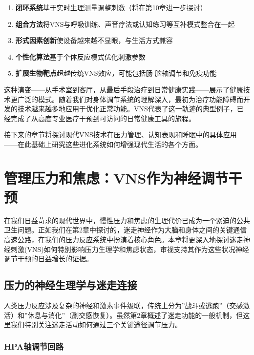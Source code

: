 \documentclass[
  Letterpaper,
]{scrbook}
\begin{document}
\begin{enumerate}
\def\labelenumi{\arabic{enumi}.}
\item
  \textbf{闭环系统}基于实时生理测量调整刺激（将在第10章进一步探讨）
\item
  \textbf{组合方法}将VNS与呼吸训练、声音疗法或认知练习等互补模式整合在一起
\item
  \textbf{形式因素创新}使设备越来越不显眼，与生活方式兼容
\item
  \textbf{个性化算法}基于个体反应模式优化刺激参数
\item
  \textbf{扩展生物靶点}超越传统VNS效应，可能包括肠-脑轴调节和免疫功能
\end{enumerate}

这种演变------从手术室到客厅，从最后手段治疗到日常健康实践------展示了健康技术更广泛的模式。随着我们对身体调节系统的理解深入，最初为治疗功能障碍而开发的技术越来越多地应用于优化正常功能。VNS代表了这一轨迹的典型例子，已经完成了从高度专业医疗干预到可访问的日常健康工具的旅程。

接下来的章节将探讨现代VNS技术在压力管理、认知表现和睡眠中的具体应用------在此基础上研究这些进化系统如何增强现代生活的各个方面。


\chapter{管理压力和焦虑：VNS作为神经调节干预}\label{ux7ba1ux7406ux538bux529bux548cux7126ux8651vnsux4f5cux4e3aux795eux7ecfux8c03ux8282ux5e72ux9884}

在我们日益苛求的现代世界中，慢性压力和焦虑的生理代价已成为一个紧迫的公共卫生问题。正如我们在第2章中探讨的，迷走神经作为大脑和身体之间的关键通信高速公路，在我们的压力反应系统中扮演着核心角色。本章将更深入地探讨迷走神经刺激(VNS)如何特别影响压力生理学和焦虑状态，审视支持其作为这些状况神经调节干预的日益增长的证据。

\section{压力的神经生理学与迷走连接}\label{ux538bux529bux7684ux795eux7ecfux751fux7406ux5b66ux4e0eux8ff7ux8d70ux8fdeux63a5}

人类压力反应涉及复杂的神经和激素事件级联，传统上分为''战斗或逃跑''（交感激活）和''休息与消化''（副交感恢复）。虽然第2章概述了迷走功能的一般机制，但这里我们特别关注迷走活动如何通过三个关键途径调节压力。

\subsection{HPA轴调节回路}\label{hpaux8f74ux8c03ux8282ux56deux8def}
\end{document}
